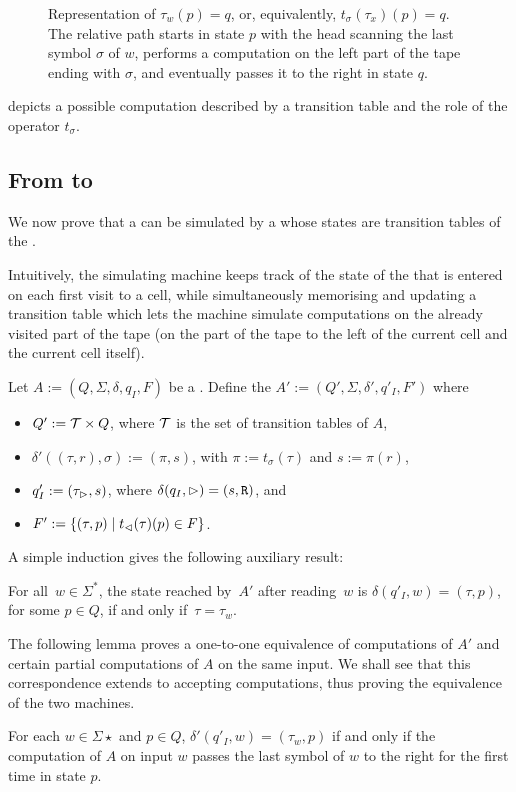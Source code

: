 \begin{figure}
	\centering
	
	\caption{Representation of $\tau_w(p)=q$, or, equivalently, $t_\sigma(\tau_x)(p)=q$.
		The relative path starts in state $p$ with the head scanning the last symbol $\sigma$ of $w$, performs a computation on the left part of the tape ending with $\sigma$, and eventually passes it to the right in state $q$.}
	\label{fig:transtab}
\end{figure}

 depicts a possible computation described by a transition table and the role of the operator $t_\sigma$.


\subsection{From \TDFAs to \ODFAs}
We now prove that a \TDFA can be simulated by a \ODFA whose states are transition tables of the \TDFA.

Intuitively, the simulating machine keeps track of the state of the \TDFA that is entered on each first visit to a cell, while simultaneously memorising and updating a transition table which lets the machine simulate computations on the already visited part of the tape (\ie on the part of the tape to the left of the current cell and the current cell itself).

Let $A:=(Q,\Sigma,\delta,q_I,F)$ be a \TDFA.
Define the \DFA $A':=(Q',\Sigma,\delta',q'_I,F')$ where
\begin{itemize}
	\item $Q':=\mathcal T\times Q$, where $\mathcal T$ is the set of transition tables of $A$,
	\item $\delta'((\tau,r),\sigma):=(\pi,s)$, with $\pi:=t_\sigma(\tau)$ and $s:=\pi(r)$,
	\item $q'_I:=(\tau_\rhd,s)$, where $\delta(q_I,\rhd)=(s,\mathtt R)$, and
	\item $F':=\{(\tau,p)\mid t_\lhd(\tau)(p)\in F\}$.
\end{itemize}

A simple induction gives the following auxiliary result:
\begin{lemm}
	For all~$w \in \Sigma^*$, the state reached by~$A'$ after reading~$w$ is $\delta(q'_I,w) = (\tau,p)$, for some $p\in Q$, if and only if~$\tau = \tau_w$.
\end{lemm}

The following lemma proves a one-to-one equivalence of computations of $A'$ and certain partial computations of $A$ on the same input. We shall see that this correspondence extends to accepting computations, thus proving the equivalence of the two machines.
\begin{lemm}\label{lem:transtab2DFA}
	For each $w\in\Sigma\star$ and $p\in Q$, $\delta'(q'_I,w)=(\tau_w,p)$ if and only if the computation of $A$ on input $w$ passes the last symbol of $w$ to the right for the first time in state $p$.
\end{lemm}


